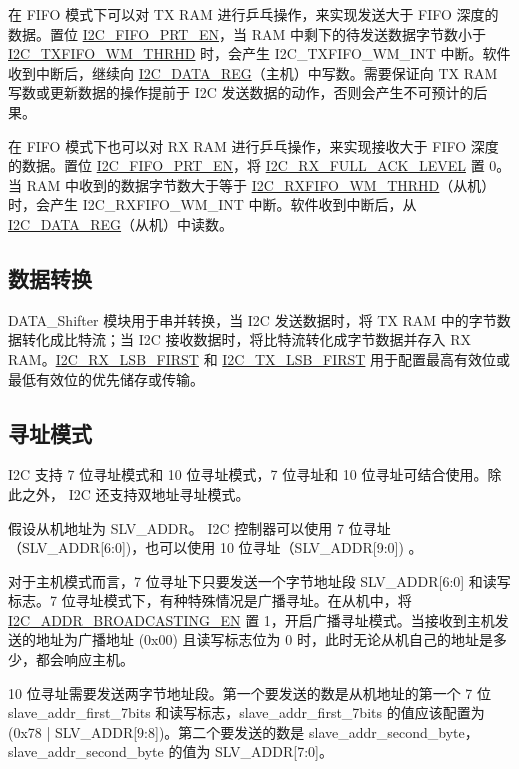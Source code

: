 \documentclass[main\_\_CN.tex]{subfiles}
\begin{document}
在 FIFO 模式下可以对 TX RAM 进行乒乓操作，来实现发送大于 FIFO 深度的数据。置位 \hyperref[fielddesc:I2CFIFOPRTEN]{I2C\_FIFO\_PRT\_EN}，当 RAM 中剩下的待发送数据字节数小于 \hyperref[fielddesc:I2CTXFIFOWMTHRHD]{I2C\_TXFIFO\_WM\_THRHD} 时，会产生 I2C\_TXFIFO\_WM\_INT 中断。软件收到中断后，继续向 \hyperref[regdesc:I2CDATAREG]{I2C\_DATA\_REG}（主机）中写数。需要保证向 TX RAM 写数或更新数据的操作提前于 I2C 发送数据的动作，否则会产生不可预计的后果。

在 FIFO 模式下也可以对 RX RAM 进行乒乓操作，来实现接收大于 FIFO 深度的数据。置位 \hyperref[fielddesc:I2CFIFOPRTEN]{I2C\_FIFO\_PRT\_EN}，将 \hyperref[fielddesc:I2CRXFULLACKLEVEL]{I2C\_RX\_FULL\_ACK\_LEVEL} 置 0。当 RAM 中收到的数据字节数大于等于 \hyperref[fielddesc:I2CRXFIFOWMTHRHD]{I2C\_RXFIFO\_WM\_THRHD}（从机）时，会产生 I2C\_RXFIFO\_WM\_INT 中断。软件收到中断后，从 \hyperref[regdesc:I2CDATAREG]{I2C\_DATA\_REG}（从机）中读数。

\subsection{数据转换}
DATA\_Shifter 模块用于串并转换，当 I2C 发送数据时，将 TX RAM 中的字节数据转化成比特流；当 I2C 接收数据时，将比特流转化成字节数据并存入 RX RAM。\hyperref[fielddesc:I2CRXLSBFIRST]{I2C\_RX\_LSB\_FIRST} 和 \hyperref[fielddesc:I2CTXLSBFIRST]{I2C\_TX\_LSB\_FIRST} 用于配置最高有效位或最低有效位的优先储存或传输。

\subsection{寻址模式}
\chipname{} I2C 支持 7 位寻址模式和 10 位寻址模式，7 位寻址和 10 位寻址可结合使用。除此之外，\chipname{} I2C 还支持双地址寻址模式。

假设从机地址为 SLV\_ADDR。 \chipname{} I2C 控制器可以使用 7 位寻址（SLV\_ADDR[6:0])，也可以使用 10 位寻址（SLV\_ADDR[9:0]) 。

对于主机模式而言，7 位寻址下只要发送一个字节地址段 SLV\_ADDR[6:0] 和读写标志。7 位寻址模式下，有种特殊情况是广播寻址。在从机中，将 \hyperref[fielddesc:I2CADDRBROADCASTINGEN]{I2C\_ADDR\_BROADCASTING\_EN} 置 1，开启广播寻址模式。当接收到主机发送的地址为广播地址 (0x00) 且读写标志位为 0 时，此时无论从机自己的地址是多少，都会响应主机。

10 位寻址需要发送两字节地址段。第一个要发送的数是从机地址的第一个 7 位 slave\_addr\_first\_7bits 和读写标志，slave\_addr\_first\_7bits 的值应该配置为 (0x78 | SLV\_ADDR[9:8])。第二个要发送的数是 slave\_addr\_second\_byte，slave\_addr\_second\_byte 的值为 SLV\_ADDR[7:0]。
\end{document}
